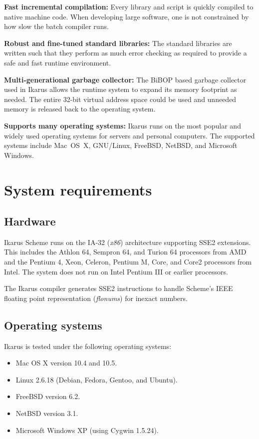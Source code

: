 \documentclass[onecolumn, 12pt, twoside, openright, dvipdfm]{book}
\begin{document}
\textbf{Fast incremental compilation:}  Every library and script is
quickly compiled to native machine code.  When developing large
software, one is not constrained by how slow the batch compiler
runs.

\textbf{Robust and fine-tuned standard libraries:}  The standard
libraries are written such that they perform as much error checking
as required to provide a safe and fast runtime environment. 

\textbf{Multi-generational garbage collector:} The
BiBOP\cite{dybvig:sm} based garbage collector used in Ikarus allows
the runtime system to expand its memory footprint as needed.  The
entire 32-bit virtual address space could be used and unneeded
memory is released back to the operating system.

\textbf{Supports many operating systems:} Ikarus runs on the most
popular and widely used operating systems for servers and personal
computers.  The supported systems include Mac~OS~X,
GNU/Linux, FreeBSD, NetBSD, and Microsoft Windows.


\section{System requirements}

\subsection{Hardware}

Ikarus Scheme runs on the IA-32 (\emph{x86}) architecture
supporting SSE2 extensions.  This includes the Athlon 64,
Sempron 64, and Turion 64 processors from AMD and the Pentium 4, Xeon,
Celeron, Pentium M, Core, and Core2 processors from Intel.  The
system does not run on Intel Pentium III or earlier
processors.

The Ikarus compiler generates SSE2 instructions to handle Scheme's
IEEE floating point representation (\emph{flonums}) for inexact
numbers. 

\subsection{Operating systems}

Ikarus is tested under the following operating systems:

\begin{itemize}
\item Mac OS X version 10.4 and 10.5.
\item Linux 2.6.18 (Debian, Fedora, Gentoo, and Ubuntu).
\item FreeBSD version 6.2.
\item NetBSD version 3.1.
\item Microsoft Windows XP (using Cygwin 1.5.24).
\end{itemize}
\end{document}
